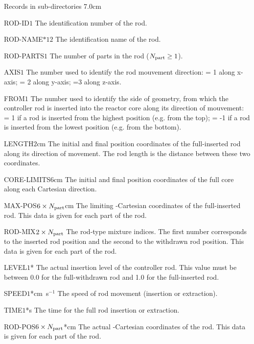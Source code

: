 \begin{DescriptionEnregistrement}{Records in  sub-directories}
{7.0cm} \label{tabl:tabrod}

\IntEnr
{ROD-ID}{$1$}
{The identification number of the rod.}

\CharEnr
{ROD-NAME}{$*12$}
{The identification name of the rod.}

\IntEnr
{ROD-PARTS}{$1$}
{The number of parts in the rod ($N_{\rm part}\ge 1$).}

\IntEnr
{AXIS}{$1$}
{The number used to identify the rod mouvement direction:
 = 1 along x-axis; = 2 along y-axis; =3 along z-axis.}

\IntEnr
{FROM}{$1$}
{The number used to identify the side of geometry, from which
 the controller rod is inserted into the reactor core along its direction
 of mouvement: = 1 if a rod is inserted from the highest position
 (e.g. from the top); = -1 if a rod is inserted from the lowest
 position (e.g. from the bottom).}

\RealEnr
{LENGTH}{$2$}{cm}
{The initial and final position coordinates of the full-inserted rod along its direction of movement. The
rod length is the distance between these two coordinates.}

\RealEnr
{CORE-LIMITS}{$6$}{cm}
{The initial and final position coordinates of the full core along each Cartesian direction.}

\RealEnr
{MAX-POS}{$6\times N_{\rm part}$}{cm}
{The limiting -Cartesian coordinates of the full-inserted rod. This
 data is given for each part of the rod.}

\IntEnr
{ROD-MIX}{$2\times N_{\rm part}$}
{The rod-type mixture indices. The first number corresponds to the
 inserted rod position and the second to the withdrawn rod position. This
 data is given for each part of the rod.}

\OptRealEnr
{LEVEL}{$1$}{*}{}
{The actual insertion level of the controller rod. This value must be
 between 0.0 for the full-withdrawn rod and 1.0 for the full-inserted rod.}

\OptRealEnr
{SPEED}{$1$}{*}{cm~s$^{-1}$}
{The speed of rod movement (insertion or extraction).}

\OptRealEnr
{TIME}{$1$}{*}{s}
{The time for the full rod insertion or extraction.}

\OptRealEnr
{ROD-POS}{$6\times N_{\rm part}$}{*}{cm}
{The actual -Cartesian coordinates of the rod. This
 data is given for each part of the rod.}

\end{DescriptionEnregistrement}

